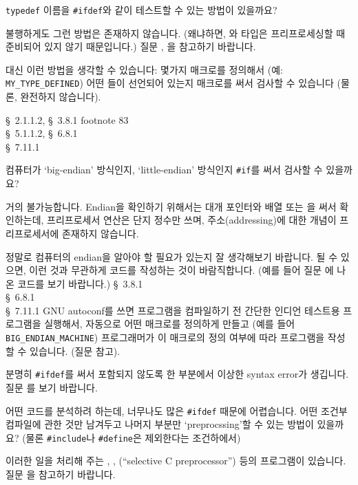 \begin{faq}
	\verb+typedef+ 이름을 \verb+#ifdef+와 같이 테스트할 수 있는
	방법이 있을까요?

\A
	불행하게도 그런 방법은 존재하지 않습니다.  (왜냐하면, 와
        타입은 프리프로세싱할 때 준비되어 있지 않기 때문입니다.) 
        질문 , 을 참고하기 바랍니다.

        대신 이런 방법을 생각할 수 있습니다: 
        몇가지 매크로를 정의해서 (예: \verb+MY_TYPE_DEFINED+)
	어떤 들이 선언되어 있는지 매크로를 써서
	검사할 수 있습니다 (물론, 완전하지 않습니다).

\R
	\cite{ansi} \S\ 2.1.1.2, \S\ 3.8.1 footnote 83 \\
	\cite{c89} \S\ 5.1.1.2, \S\ 6.8.1 \\
	\cite{hs} \S\ 7.11.1 
\end{faq}

\begin{faq}
	컴퓨터가 `big-endian' 방식인지, `little-endian' 방식인지
	\verb+#if+를 써서 검사할 수 있을까요?

\A
	거의 불가능합니다. Endian을 확인하기 위해서는 대개 포인터와
         배열 또는 을 써서 확인하는데, 프리프로세서 연산은
        단지  정수만 쓰며, 주소(addressing)에 대한 개념이 
        프리프로세서에 존재하지 않습니다.
	
        정말로 컴퓨터의 endian을 알아야 할 필요가 있는지 잘 생각해보기 바랍니다.
	될 수 있으면, 이런 것과 무관하게 코드를 작성하는 것이 바람직합니다.
        (예를 들어 질문 에 나온 코드를 보기 바랍니다.)
\R
	\cite{ansi} \S\ 3.8.1 \\
	\cite{c89} \S\ 6.8.1 \\
	\cite{hs} \S\ 7.11.1 
\T
	GNU autoconf를 쓰면 프로그램을 컴파일하기 전
	간단한 인디언 테스트용 프로그램을 실행해서, 자동으로 
	어떤 매크로를 정의하게 만들고 (예를 들어 \verb+BIG_ENDIAN_MACHINE+)
        프로그래머가 이 매크로의 정의 여부에 따라 프로그램을 작성할
        수 있습니다.  (질문  참고).
\end{faq}

\begin{faq}
	분명히 \verb+#ifdef+를 써서 포함되지 않도록 한 부분에서 이상한
        syntax error가 생깁니다.
\A
	질문 를 보기 바랍니다.
\end{faq}

\begin{faq}
	어떤 코드를 분석하려 하는데, 너무나도 많은 \verb+#ifdef+ 때문에
	어렵습니다.  어떤 조건부 컴파일에 관한 것만 남겨두고 나머지
	부분만 `preprocssing'할 수 있는 방법이 있을까요? (물론
	\verb+#include+나 \verb+#define+은 제외한다는 조건하에서)

\A
	이러한 일을 처리해 주는 , , 
	(``selective C preprocessor'') 등의 프로그램이 있습니다.
	질문 을 참고하기 바랍니다.
\end{faq}

